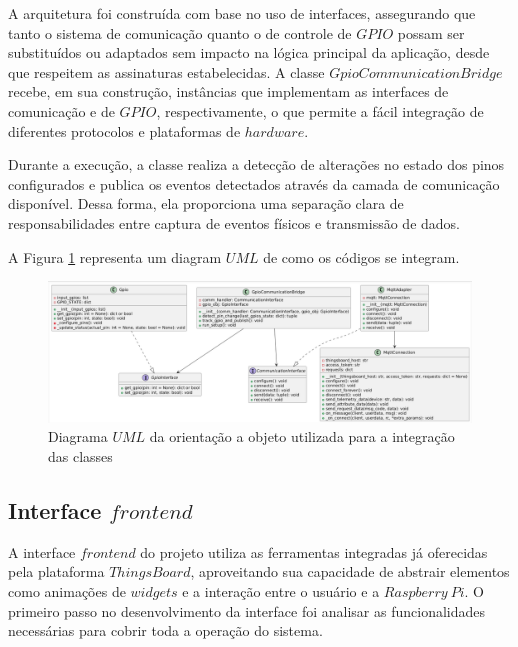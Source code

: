 \documentclass{ecatfg}
\begin{document}
A arquitetura foi construída com base no uso de interfaces, assegurando que tanto o sistema de comunicação quanto o de controle de $GPIO$ possam ser substituídos ou adaptados sem impacto na lógica principal da aplicação, desde que respeitem as assinaturas estabelecidas. A classe $GpioCommunicationBridge$ recebe, em sua construção, instâncias que implementam as interfaces de comunicação e de $GPIO$, respectivamente, o que permite a fácil integração de diferentes protocolos e plataformas de $hardware$.\par

Durante a execução, a classe realiza a detecção de alterações no estado dos pinos configurados e publica os eventos detectados através da camada de comunicação disponível. Dessa forma, ela proporciona uma separação clara de responsabilidades entre captura de eventos físicos e transmissão de dados.\par

A Figura \ref{fig:diagrama_uml_gpio_communication} representa um diagram $UML$ de como os códigos se integram.\par
\begin{figure}[!htb]
    \centering
    \includegraphics[scale=0.17]{Figuras/diagrama_uml_gpio_communication.png}
    \caption{Diagrama $UML$ da orientação a objeto utilizada para a integração das classes}
    \label{fig:diagrama_uml_gpio_communication}
\end{figure}

\subsection{Interface $frontend$}

A interface $frontend$ do projeto utiliza as ferramentas integradas já oferecidas pela plataforma $ThingsBoard$, aproveitando sua capacidade de abstrair elementos como animações de $widgets$ e a interação entre o usuário e a $Raspberry\ Pi$. O primeiro passo no desenvolvimento da interface foi analisar as funcionalidades necessárias para cobrir toda a operação do sistema. \par
\end{document}
